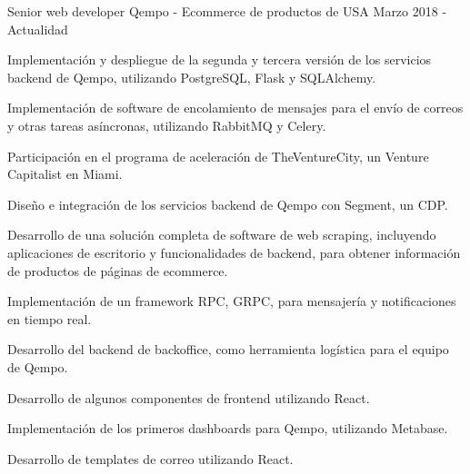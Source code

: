 

\begin{cventries}

  \cventry
    {Senior web developer} %
    {Qempo {\normalfont - Ecommerce de productos de USA}} %
    {} %
    {Marzo 2018 - Actualidad} %
    {
      \begin{cvitems} %
        \item {Implementación y despliegue de la segunda y tercera versión de los servicios backend de Qempo, utilizando PostgreSQL, Flask y SQLAlchemy.}
        \item {Implementación de software de encolamiento de mensajes para el envío de correos y otras tareas asíncronas, utilizando RabbitMQ y Celery.}
        \item {Participación en el programa de aceleración de TheVentureCity, un Venture Capitalist en Miami.}
        \item {Diseño e integración de los servicios backend de Qempo con Segment, un CDP.}
        \item {Desarrollo de una solución completa de software de web scraping, incluyendo aplicaciones de escritorio y funcionalidades de backend, para obtener información de productos de páginas de ecommerce.}
        \item {Implementación de un framework RPC, GRPC, para mensajería y notificaciones en tiempo real.}
        \item {Desarrollo del backend de backoffice, como herramienta logística para el equipo de Qempo.}
        \item {Desarrollo de algunos componentes de frontend utilizando React.}
        \item {Implementación de los primeros dashboards para Qempo, utilizando Metabase.}
        \item {Desarrollo de templates de correo utilizando React.}
      \end{cvitems}
    }


\end{cventries}
